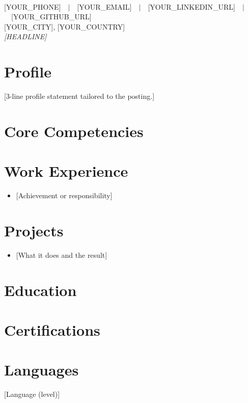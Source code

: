 
\ifpdftex\usepackage[T1]{fontenc}\fi %


\begin{center}
{\large\bfseries{}}\\[1pt]
{\small [YOUR_PHONE]\ \ $|$\ \ [YOUR_EMAIL]\ \ $|$\ \ [YOUR_LINKEDIN_URL]\ \ $|$\ \ [YOUR_GITHUB_URL]}\\
{\small [YOUR_CITY], [YOUR_COUNTRY]}\\[1pt]
{\small\itshape\textcolor{meta}{[HEADLINE]}}
\end{center}
\vspace{-6pt}

\section{Profile}
[3-line profile statement tailored to the posting.]

\section{Core Competencies}
\skill{[Category]}{[skills]}

\section{Work Experience}
\begin{itemize}
  \item {[Achievement or responsibility]}
\end{itemize}

\section{Projects}
\begin{itemize}
  \item {[What it does and the result]}
\end{itemize}

\section{Education}

\section{Certifications}
\entry{[Certification]}{[Issuer]}{[Date]}{}

\section{Languages}
[Language (level)]


